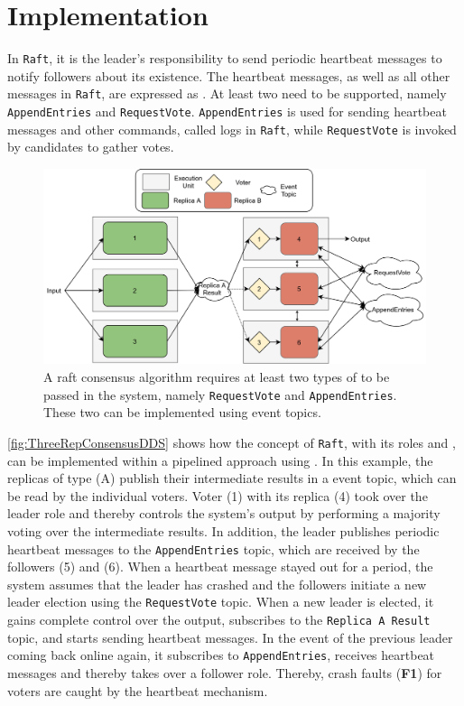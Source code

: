 \chapter{Implementation}

In \texttt{Raft}, it is the leader's responsibility to send periodic heartbeat messages to notify followers about its existence.
The heartbeat messages, as well as all other messages in \texttt{Raft}, are expressed as .
At least two  need to be supported, namely \texttt{AppendEntries} and \texttt{RequestVote}.
\texttt{AppendEntries} is used for sending heartbeat messages and other commands, called logs in \texttt{Raft}, while \texttt{RequestVote} is invoked by candidates to gather votes.

\begin{figure}[!hb]
	\centering
	\includegraphics[width=0.9\linewidth]{images/ThreeComponentConsensusDDS}
	\caption{A raft consensus algorithm requires at least two types of  to be passed in the system, namely \texttt{RequestVote} and \texttt{AppendEntries}. These two can be implemented using  event topics.}
	\label{fig:ThreeRepConsensusDDS}
\end{figure}

\autoref{fig:ThreeRepConsensusDDS} shows how the concept of \texttt{Raft}, with its roles and , can be implemented within a pipelined approach using .
In this example, the replicas of type (A) publish their intermediate results in a  event topic, which can be read by the individual voters.
Voter (1) with its replica (4) took over the leader role and thereby controls the system's output by performing a majority voting over the intermediate results.
In addition, the leader publishes periodic heartbeat messages to the \texttt{AppendEntries} topic, which are received by the followers (5) and (6).
When a heartbeat message stayed out for a period, the system assumes that the leader has crashed and the followers initiate a new leader election using the \texttt{RequestVote} topic.
When a new leader is elected, it gains complete control over the output, subscribes to the \texttt{Replica A Result} topic, and starts sending heartbeat messages.
In the event of the previous leader coming back online again, it subscribes to \texttt{AppendEntries}, receives heartbeat messages and thereby takes over a follower role.
Thereby, crash faults (\textbf{F1}) for voters are caught by the heartbeat mechanism.
\\

